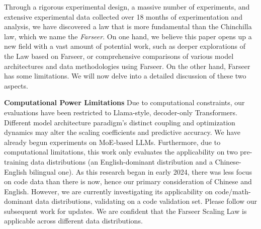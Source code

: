 \documentclass{article}
\newcommand{\eg}{{\emph{e.g.}}, }
\begin{document}


Through a rigorous experimental design, a massive number of experiments, and extensive experimental data collected over 18 months of experimentation and analysis, we have discovered a law that is more fundamental than the Chinchilla law, which we name the \textit{Farseer}. On one hand, we believe this paper opens up a new field with a vast amount of potential work, such as deeper explorations of the Law based on Farseer, or comprehensive comparisons of various model architectures and data methodologies using Farseer. On the other hand, Farseer has some limitations. We will now delve into a detailed discussion of these two aspects.

\textbf{Computational Power Limitations}
    Due to computational constraints, our evaluations have been restricted to Llama-style, decoder-only Transformers. Different model architecture paradigm’s distinct coupling and optimization dynamics may alter the scaling coefficients and predictive accuracy. We have already begun experiments on MoE-based LLMs.
    Furthermore, due to computational limitations, this work only evaluates the applicability on two pre-training data distributions (an English-dominant distribution and a Chinese-English bilingual one). As this research began in early 2024, there was less focus on code data than there is now, hence our primary consideration of Chinese and English. However, we are currently investigating its applicability on code/math-dominant data distributions, validating on a code validation set. Please follow our subsequent work for updates. We are confident that the Farseer Scaling Law is applicable across different data distributions.
\end{document}
